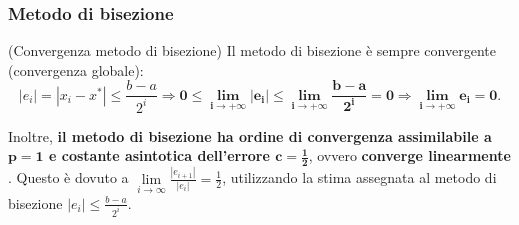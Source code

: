 \subsubsection{Metodo di bisezione}\label{ssec:convergenza_metodo_bisezione}
\begin{remark}(Convergenza metodo di bisezione)
	Il metodo di bisezione è sempre convergente (convergenza globale): 
	\begin{equation*}
		|e_i|=|x_i-x^*|\leq \frac{b-a}{2^i}\Rightarrow \boldsymbol{0\leq \lim_{i\to + \infty}|e_i|\leq \lim_{i\to + \infty}{\frac{b-a}{2^i}=0}\Rightarrow \lim_{i\to + \infty}{e_i}=0.}
	\end{equation*}
\end{remark}

\noindent Inoltre, \textbf{il metodo di bisezione ha ordine di convergenza assimilabile a $\boldsymbol{p=1}$ e costante asintotica dell'errore $\boldsymbol{c=\frac{1}{2}}$}, ovvero \textbf{converge linearmente} \footnotemark. Questo è dovuto a $\underset{{i\to\infty}}{\lim}{\frac{|e_{i+1}|}{|e_i|}}=\frac{1}{2}$, utilizzando la stima assegnata al metodo di bisezione $|e_i|\leq\frac{b-a}{2^i}$.


